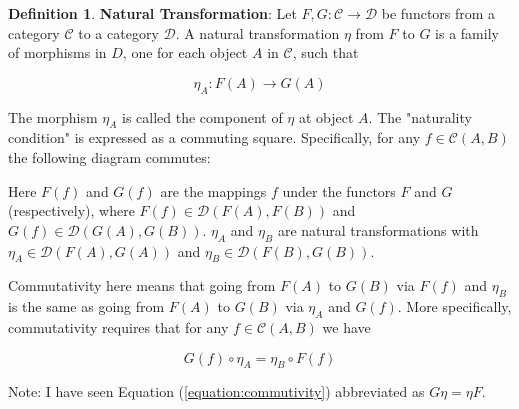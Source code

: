 \documentclass{article}
\theoremstyle{definition}
\newtheorem{definition}{Definition}[section]
\begin{document}
\begin{definition} 
\label{definition:natural_transformation}
{\bf Natural Transformation}: Let $F,G: \mathcal{C} \to
\mathcal{D}$ be functors from a category $\mathcal{C}$ to 
a category $\mathcal{D}$. A natural transformation $\eta$ 
from $F$ to $G$ is a family of morphisms in $D$, one for 
each object $A$ in $\mathcal{C}$, such that

\begin{equation*}
\eta_{A}:F(A)\to G(A)
\end{equation*}
\end{definition}

\medskip
\noindent
The morphism $\eta_{A}$ is called the component of 
$\eta$ at object $A$. The "naturality condition"
is expressed as a commuting square. Specifically,
for any $f \in \mathcal{C}(A,B)$ the following diagram
commutes:
%
%
%
\medskip
%
%
%
%
%
\begin{center}
\end{center}


\medskip
\noindent
Here $F(f)$ and $G(f)$ 
are the mappings $f$ under the functors $F$ and $G$ 
(respectively), where $F(f) \in \mathcal{D}(F(A),F(B))$ 
and $G(f) \in \mathcal{D}(G(A),G(B))$. $\eta_{A}$ and 
$\eta_{B}$ are natural transformations with $\eta_{A} 
\in \mathcal{D}(F(A),G(A))$ and $\eta_{B} \in 
\mathcal{D}(F(B),G(B))$.

\bigskip
\noindent
Commutativity here means that going from $F(A)$ to $G(B)$ via
$F(f)$ and $\eta_{B}$ is the same as going from $F(A)$ to $G(B)$
via $\eta_{A}$ and $G(f)$.  More specifically, commutativity
requires that for any $f \in \mathcal{C}(A,B)$ we have 

\begin{equation}
G(f) \circ \eta_{A} = \eta_{B} \circ F(f)
\label{equation:commutivity}
\end{equation}

\bigskip
\noindent
Note: I have seen Equation (\ref{equation:commutivity}) 
abbreviated as $G \eta = \eta F$.
\end{document}
